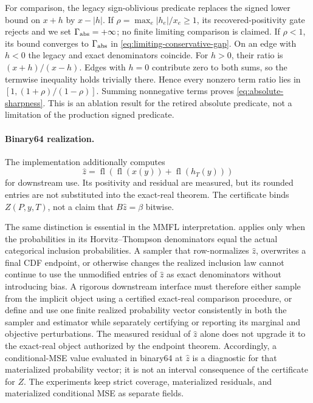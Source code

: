 For comparison, the legacy sign-oblivious predicate replaces the signed lower
bound on $x+h$ by $x-|h|$.  If
$\rho=\max_e|h_e|/x_e\ge1$, its recovered-positivity gate rejects and we set
$\Gamma_{\rm abs}=+\infty$; no finite limiting comparison is claimed.  If
$\rho<1$, its bound converges to $\Gamma_{\rm abs}$ in
\cref{eq:limiting-conservative-gap}.  On an edge with $h<0$ the legacy and exact
denominators coincide.  For $h>0$, their ratio is $(x+h)/(x-h)$.
Edges with $h=0$ contribute zero to both sums, so the termwise inequality holds
trivially there.  Hence every nonzero term ratio lies in
$[1,(1+\rho)/(1-\rho)]$.  Summing nonnegative terms proves
\cref{eq:absolute-sharpness}.  This is an ablation result for the retired
absolute predicate, not a limitation of the production signed predicate.

\paragraph{Binary64 realization.}
The implementation additionally computes
\begin{equation}
 \widehat z=\operatorname{fl}\!\left(
 \operatorname{fl}(x(y))+\operatorname{fl}(h_T(y))\right)
\end{equation}
for downstream use.  Its positivity and residual are measured, but its rounded
entries are not substituted into the exact-real theorem.  The certificate binds
$Z(P,y,T)$, not a claim that $B\widehat z=\beta$ bitwise.

The same distinction is essential in the MMFL interpretation.
 applies only when the probabilities in its
Horvitz--Thompson denominators equal the actual categorical inclusion
probabilities.  A sampler that row-normalizes $\widehat z$, overwrites a final
CDF endpoint, or otherwise changes the realized inclusion law cannot continue
to use the unmodified entries of $\widehat z$ as exact denominators without
introducing bias.  A rigorous downstream interface must therefore either sample
from the implicit object using a certified exact-real comparison procedure, or
define and use one finite realized probability vector consistently in both the
sampler and estimator while separately certifying or reporting its marginal and
objective perturbations.  The measured residual of $\widehat z$ alone does not
upgrade it to the exact-real object authorized by the endpoint theorem.
Accordingly, a conditional-MSE value evaluated in binary64 at $\widehat z$ is a
diagnostic for that materialized probability vector; it is not an interval
consequence of the certificate for $Z$.  The experiments keep strict coverage,
materialized residuals, and materialized conditional MSE as separate fields.

